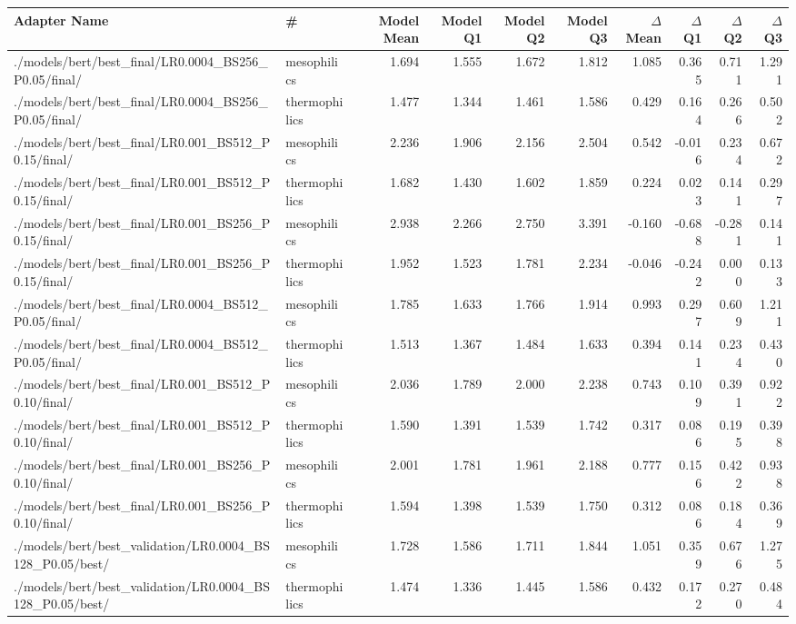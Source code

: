 \begin{tabular}{llrrrrrrrr}
	\toprule
	Adapter Name & # & Model Mean & Model Q1 & Model Q2 & Model Q3 & $\Delta$ Mean & $\Delta$ Q1 & $\Delta$ Q2 & $\Delta$ Q3 \\
	\midrule
	./models/bert/best_final/LR0.0004_BS256_P0.05/final/ & mesophilics &1.694 & 1.555 & 1.672 & 1.812 & 1.085 & 0.365 & 0.711 & 1.291\\
	./models/bert/best_final/LR0.0004_BS256_P0.05/final/ & thermophilics &1.477 & 1.344 & 1.461 & 1.586 & 0.429 & 0.164 & 0.266 & 0.502\\
	./models/bert/best_final/LR0.001_BS512_P0.15/final/ & mesophilics &2.236 & 1.906 & 2.156 & 2.504 & 0.542 & -0.016 & 0.234 & 0.672\\
	./models/bert/best_final/LR0.001_BS512_P0.15/final/ & thermophilics &1.682 & 1.430 & 1.602 & 1.859 & 0.224 & 0.023 & 0.141 & 0.297\\
	./models/bert/best_final/LR0.001_BS256_P0.15/final/ & mesophilics &2.938 & 2.266 & 2.750 & 3.391 & -0.160 & -0.688 & -0.281 & 0.141\\
	./models/bert/best_final/LR0.001_BS256_P0.15/final/ & thermophilics &1.952 & 1.523 & 1.781 & 2.234 & -0.046 & -0.242 & 0.000 & 0.133\\
	./models/bert/best_final/LR0.0004_BS512_P0.05/final/ & mesophilics &1.785 & 1.633 & 1.766 & 1.914 & 0.993 & 0.297 & 0.609 & 1.211\\
	./models/bert/best_final/LR0.0004_BS512_P0.05/final/ & thermophilics &1.513 & 1.367 & 1.484 & 1.633 & 0.394 & 0.141 & 0.234 & 0.430\\
	./models/bert/best_final/LR0.001_BS512_P0.10/final/ & mesophilics &2.036 & 1.789 & 2.000 & 2.238 & 0.743 & 0.109 & 0.391 & 0.922\\
	./models/bert/best_final/LR0.001_BS512_P0.10/final/ & thermophilics &1.590 & 1.391 & 1.539 & 1.742 & 0.317 & 0.086 & 0.195 & 0.398\\
	./models/bert/best_final/LR0.001_BS256_P0.10/final/ & mesophilics &2.001 & 1.781 & 1.961 & 2.188 & 0.777 & 0.156 & 0.422 & 0.938\\
	./models/bert/best_final/LR0.001_BS256_P0.10/final/ & thermophilics &1.594 & 1.398 & 1.539 & 1.750 & 0.312 & 0.086 & 0.184 & 0.369\\
	./models/bert/best_validation/LR0.0004_BS128_P0.05/best/ & mesophilics &1.728 & 1.586 & 1.711 & 1.844 & 1.051 & 0.359 & 0.676 & 1.275\\
	./models/bert/best_validation/LR0.0004_BS128_P0.05/best/ & thermophilics &1.474 & 1.336 & 1.445 & 1.586 & 0.432 & 0.172 & 0.270 & 0.484\\

\end{tabular}
